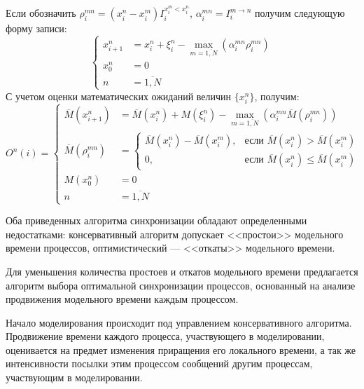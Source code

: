 Если обозначить $\rho_i^{mn}=(x_i^n-x_i^m)I_i^{x_i^m<x_i^n}$, $\alpha_i^{mn}=I_i^{m\rightarrow n}$ получим следующую форму записи:
\begin{equation}
\label{eq:АС с синхронизацией взаимодействий}
\left\{
\begin{aligned}
x_{i+1}^n & = x_i^n + \xi_i^n-\max\limits_{m=\overline{1, N}}(\alpha_i^{mn}\rho_i^{mn})\\
x_0^n & = 0\\
n & = \overline{1, N}
\end{aligned}
\right.
\end{equation}
С учетом оценки математических ожиданий величин $\{x_i^{n}\}$, получим:
\begin{equation}
\label{eq:АС с синхронизацией взаимодействий}
O^n(i)=
\left\{
\begin{aligned}
\overline{M}(x_{i+1}^n) & = \overline{M}(x_i^n) + M(\xi_i^n)-\max\limits_{m=\overline{1, N}}(\alpha_i^{mn}\overline{M}(\rho_i^{mn}))\\
\overline{M}(\rho_i^{mn}) & = \begin{cases}
\overline{M}(x_i^n)-\overline{M}(x_i^m), & \text{если $\overline{M}(x_i^n)>\overline{M}(x_i^m)$} \\
 0, & \text{если $\overline{M}(x_i^n)\leqslant\overline{M}(x_i^m)$}
 \end{cases}\\
M(x_0^n) & = 0\\
n & = \overline{1, N}
\end{aligned}
\right.
\end{equation}

Оба приведенных алгоритма синхронизации обладают определенными недостатками: консервативный алгоритм допускает <<простои>> модельного времени процессов, оптимистический --- <<откаты>> модельного времени.

Для уменьшения количества простоев и откатов модельного времени предлагается алгоритм выбора оптимальной синхронизации процессов, основанный на анализе продвижения модельного времени каждым процессом.

Начало моделирования происходит под управлением консервативного алгоритма. Продвижение времени каждого процесса, участвующего в моделировании, оценивается на предмет изменения приращения его локального времени, а так же интенсивности посылки этим процессом сообщений другим процессам, участвующим в моделировании.


